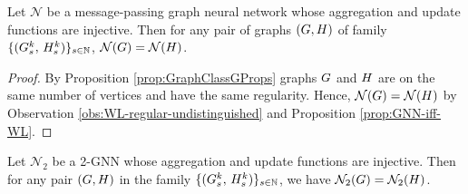 \begin{theorem}
    Let $\mathcal{N}$ be a message-passing graph neural network whose aggregation and update
functions are injective. Then for any pair of graphs $(G, H)$ of family  $\{(G_s^k,\, H_s^k)\}_{s \in \mathbb{N}}$, $\mathcal{N}(G) = \mathcal{N}(H)$.
\end{theorem}
\begin{proof}
    By Proposition \ref{prop:GraphClassGProps} graphs $G$ and $H$ are on the same number of vertices and have the same regularity. Hence, $\mathcal{N}(G) = \mathcal{N}(H)$ by Observation \ref{obs:WL-regular-undistinguished} and Proposition \ref{prop:GNN-iff-WL}.
\end{proof}


\begin{theorem}
    Let $\mathcal{N}_2$ be a 2-GNN whose aggregation and update
    functions are injective. Then for any pair $(G,H)$ in the family
    $\{(G_s^k,\, H_s^k)\}_{s \in \mathbb{N}}$, we have $\mathcal{N}_2(G)=\mathcal{N}_2(H)$.
\end{theorem}



